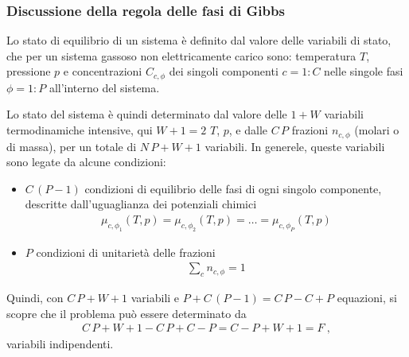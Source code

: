 \documentclass[letterpaper,10pt,italian]{jupyterBook}
\begin{document}
\subsubsection*{Discussione della regola delle fasi di Gibbs}

\sphinxAtStartPar
Lo stato di equilibrio di un sistema è definito dal valore delle variabili di stato, che per un sistema gassoso non elettricamente carico sono: temperatura \(T\), pressione \(p\) e concentrazioni \(C_{c,\phi}\) dei singoli componenti \(c=1:C\) nelle singole fasi \(\phi = 1:P\) all’interno del sistema.

\sphinxAtStartPar
Lo stato del sistema è quindi determinato dal valore delle \(1+W\) variabili termodinamiche intensive, qui \(W+1=2\) \(T\), \(p\), e dalle \(C \, P\) frazioni \(n_{c,\phi}\) (molari o di massa), per un totale di \(N \, P + W + 1\) variabili.
In generele, queste variabili sono legate da alcune condizioni:
\begin{itemize}
\item {} 
\sphinxAtStartPar
\(C \, (P-1)\) condizioni di equilibrio delle fasi di ogni singolo componente, descritte dall’uguaglianza dei potenziali chimici
\begin{equation*}
\begin{split}\mu_{c,\phi_1}(T,p) = \mu_{c,\phi_2}(T,p) = \dots = \mu_{c,\phi_P}(T,p)\end{split}
\end{equation*}
\item {} 
\sphinxAtStartPar
\(P\) condizioni di unitarietà delle frazioni
\begin{equation*}
\begin{split}\sum_{c} n_{c,\phi} = 1\end{split}
\end{equation*}
\end{itemize}

\sphinxAtStartPar
Quindi, con \(C \, P + W + 1\) variabili e \(P + C\, (P-1) = C \, P - C + P\) equazioni, si scopre che il problema può essere determinato da
\begin{equation*}
\begin{split}C \, P + W + 1 - C \, P + C - P  =  C - P + W + 1 = F \ ,\end{split}
\end{equation*}
\sphinxAtStartPar
variabili indipendenti.
\end{document}
